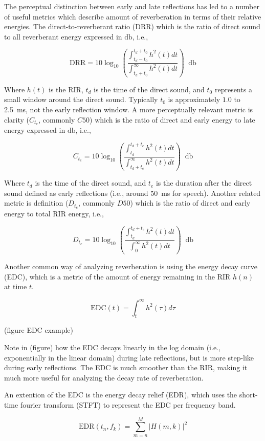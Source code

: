 The perceptual distinction between early and late reflections has led to a number of useful metrics which describe amount of reverberation in terms of their relative energies. The direct-to-reverberant ratio (DRR) which is the ratio of direct sound to all reverberant energy expressed in $\unit{\decibel}$, i.e.,

\[\mathrm{DRR} = 10\log_{10}\left(\frac{\int_{t_d-t_0}^{t_d+t_0}h^2(t)dt}{\int_{t_d+t_0}^{\infty}h^2(t)dt}\right)\;\;\unit{\decibel}\]

Where $h(t)$ is the RIR, $t_d$ is the time of the direct sound, and $t_0$ represents a small window around the direct sound. Typically $t_0$ is approximately $1.0$ to \qty{2.5}{\milli\second}, not the early reflection window. A more perceptually relevant metric is clarity ($C_{t_e}$, commonly $C50$) which is the ratio of direct and early energy to late energy expressed in $\unit{\decibel}$, i.e.,

\[C_{t_e} = 10\log_{10}\left(\frac{\int_{t_d}^{t_d+t_e}h^2(t)dt}{\int_{t_d+t_e}^{\infty}h^2(t)dt}\right)\;\;\unit{\decibel}\]


Where $t_d$ is the time of the direct sound, and $t_e$ is the duration after the direct sound defined as early reflections (i.e., around \qty{50}{\milli\second} for speech). Another related metric is definition ($D_{t_e}$, commonly $D50$) which is the ratio of direct and early energy to total RIR energy, i.e.,

\[D_{t_e} = 10\log_{10}\left(\frac{\int_{t_d}^{t_d+t_e}h^2(t)dt}{\int_{0}^{\infty}h^2(t)dt}\right)\;\;\unit{\decibel}\]

Another common way of analyzing reverberation is using the energy decay curve (EDC), which is a metric of the amount of energy remaining in the RIR $h(n)$ at time $t$.

\[\mathrm{EDC}(t)=\int_{t}^{\infty}h^2(\tau)d\tau\]

(figure EDC example)

Note in (figure) how the EDC decays linearly in the log domain (i.e., exponentially in the linear domain) during late reflections, but is more step-like during early reflections. The EDC is much smoother than the RIR, making it much more useful for analyzing the decay rate of reverberation.

An extention of the EDC is the energy decay relief (EDR), which uses the short-time fourier transform (STFT) to represent the EDC per frequency band.

\[\mathrm{EDR}(t_n,f_k)=\sum_{m=n}^{M}|H(m,k)|^2\]

